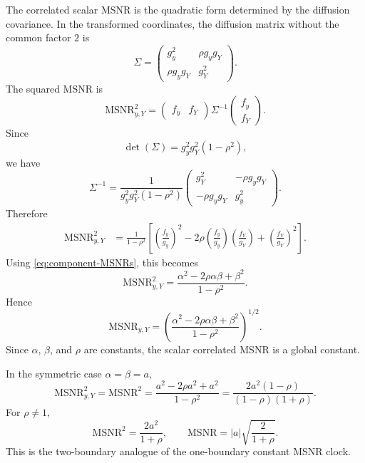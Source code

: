 \documentclass[11pt]{article}
\numberwithin{equation}{section}
\begin{document}
The correlated scalar MSNR is the quadratic form determined by the diffusion covariance. In the transformed coordinates, the diffusion matrix without the common factor \(2\) is
\begin{equation}
\label{eq:Sigma-yY}
\Sigma
=
\begin{pmatrix}
g_y^2 & \rho g_yg_Y \\
\rho g_yg_Y & g_Y^2
\end{pmatrix}.
\end{equation}
The squared MSNR is
\begin{equation}
\label{eq:MSNR-quadratic-form}
\mathrm{MSNR}_{y,Y}^2
=
\begin{pmatrix} f_y & f_Y \end{pmatrix}
\Sigma^{-1}
\begin{pmatrix} f_y \\ f_Y \end{pmatrix}.
\end{equation}
Since
\[
\det(\Sigma)=g_y^2g_Y^2(1-\rho^2),
\]
we have
\[
\Sigma^{-1}
=
\frac{1}{g_y^2g_Y^2(1-\rho^2)}
\begin{pmatrix}
g_Y^2 & -\rho g_yg_Y \\
-\rho g_yg_Y & g_y^2
\end{pmatrix}.
\]
Therefore
\begin{align}
\label{eq:MSNR-expanded}
\mathrm{MSNR}_{y,Y}^2
&=
\frac{1}{1-\rho^2}
\left[
\left(\frac{f_y}{g_y}\right)^2
-2\rho\left(\frac{f_y}{g_y}\right)\left(\frac{f_Y}{g_Y}\right)
+
\left(\frac{f_Y}{g_Y}\right)^2
\right].
\end{align}
Using \eqref{eq:component-MSNRs}, this becomes
\begin{equation}
\label{eq:constant-correlated-MSNR}
\boxed{
\mathrm{MSNR}_{y,Y}^2
=
\frac{\alpha^2-2\rho\alpha\beta+\beta^2}{1-\rho^2}.
}
\end{equation}
Hence
\begin{equation}
\label{eq:constant-correlated-MSNR-root}
\boxed{
\mathrm{MSNR}_{y,Y}
=
\left(\frac{\alpha^2-2\rho\alpha\beta+\beta^2}{1-\rho^2}\right)^{1/2}.
}
\end{equation}
Since \(\alpha\), \(\beta\), and \(\rho\) are constants, the scalar correlated MSNR is a global constant.

In the symmetric case \(\alpha=\beta=a\),
\[
\mathrm{MSNR}_{y,Y}^2=\mathrm{MSNR}^2
=
\frac{a^2-2\rho a^2+a^2}{1-\rho^2}
=
\frac{2a^2(1-\rho)}{(1-\rho)(1+\rho)}.
\]
For \(\rho\neq1\),
\begin{equation}
\label{eq:symmetric-MSNR}
\boxed{
\mathrm{MSNR}^2=\frac{2a^2}{1+\rho},
\qquad
\mathrm{MSNR}=|a|\sqrt{\frac{2}{1+\rho}}.
}
\end{equation}
This is the two-boundary analogue of the one-boundary constant MSNR clock.
\end{document}
